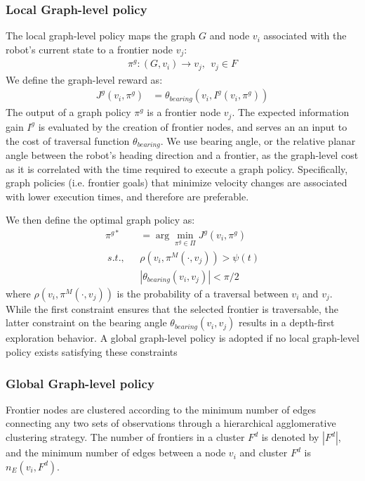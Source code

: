 \documentclass[letterpaper, 10 pt, conference]{ieeeconf}  %
\begin{document}
\subsubsection{Local Graph-level policy}
The local graph-level policy maps the graph $G$ and node $v_i$ associated with the robot's current state to a frontier node $v_j$:
\begin{align}
  \pi^g: (G,v_i) \rightarrow v_j,~~ v_j \in F
\end{align}
We define the graph-level reward as:
\begin{align}
    J^{g}(v_i, \pi^g) &= \theta_{bearing}(v_i, I^g(v_i,\pi^g)) 
\end{align}
The output of a graph policy $\pi^g$ is a frontier node $v_j$. The expected information gain $I^g$ is evaluated by the creation of frontier nodes, and serves an an input to the cost of traversal function $\theta_{bearing}$. We use bearing angle, or the relative planar angle between the robot's heading direction and a frontier, as the graph-level cost as it is correlated with the time required to execute a graph policy. Specifically, graph policies (i.e. frontier goals) that minimize velocity changes are associated with lower execution times, and therefore are preferable.  

We then define the optimal graph policy as:
\begin{align}
    \pi^{g*} &= \arg\min_{\pi^g \in \Pi} J^{g}(v_i, \pi^g) \nonumber \\
    ~s.t.,~~~ & \rho(v_i,\pi^M(\cdot,v_j)) > \psi(t) \nonumber \\
    & |\theta_{bearing}(v_i, v_j)| < \pi/2 
    \label{eq:local_constraint}
\end{align}
where $\rho(v_i,\pi^M(\cdot,v_j))$ is the probability of a traversal between $v_i$ and $v_j$. While the first constraint ensures that the selected frontier is traversable, the latter constraint on the bearing angle $\theta_{bearing}(v_i, v_j)$ results in a depth-first exploration behavior. A global graph-level policy is adopted if no local graph-level policy exists satisfying these constraints

\subsubsection{Global Graph-level policy}
Frontier nodes are clustered according to the minimum number of edges connecting any two sets of observations through a hierarchical agglomerative clustering strategy. The number of frontiers in a cluster $F^d$ is denoted by $|F^d|$, and the minimum number of edges between a node $v_i$ and cluster $F^d$ is $n_E(v_i,F^d)$. 
\end{document}
